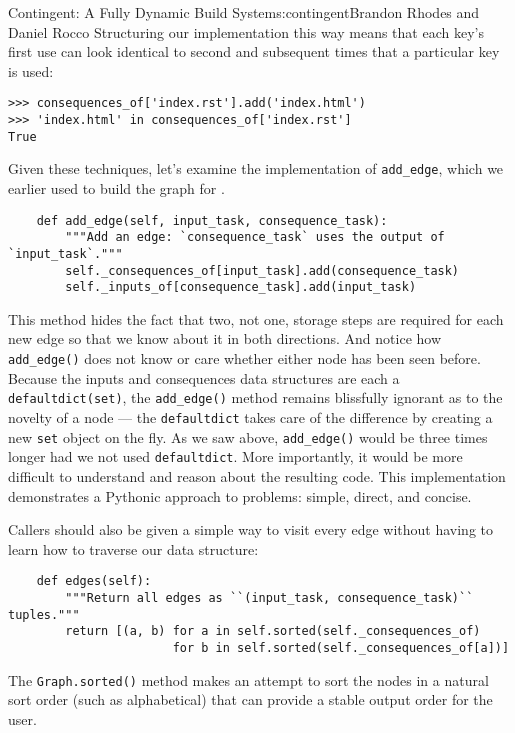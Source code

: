 \begin{aosachapter}{Contingent: A Fully Dynamic Build System}{s:contingent}{Brandon Rhodes and Daniel Rocco}
Structuring our implementation this way means that each key's first use
can look identical to second and subsequent times that a particular key
is used:

\begin{verbatim}
>>> consequences_of['index.rst'].add('index.html')
>>> 'index.html' in consequences_of['index.rst']
True
\end{verbatim}

Given these techniques, let's examine the implementation of
\texttt{add\_edge}, which we earlier used to build the graph for
.

\begin{verbatim}
    def add_edge(self, input_task, consequence_task):
        """Add an edge: `consequence_task` uses the output of `input_task`."""
        self._consequences_of[input_task].add(consequence_task)
        self._inputs_of[consequence_task].add(input_task)
\end{verbatim}

This method hides the fact that two, not one, storage steps are required
for each new edge so that we know about it in both directions. And
notice how \texttt{add\_edge()} does not know or care whether either
node has been seen before. Because the inputs and consequences data
structures are each a \texttt{defaultdict(set)}, the
\texttt{add\_edge()} method remains blissfully ignorant as to the
novelty of a node --- the \texttt{defaultdict} takes care of the
difference by creating a new \texttt{set} object on the fly. As we saw
above, \texttt{add\_edge()} would be three times longer had we not used
\texttt{defaultdict}. More importantly, it would be more difficult to
understand and reason about the resulting code. This implementation
demonstrates a Pythonic approach to problems: simple, direct, and
concise.

Callers should also be given a simple way to visit every edge without
having to learn how to traverse our data structure:

\begin{verbatim}
    def edges(self):
        """Return all edges as ``(input_task, consequence_task)`` tuples."""
        return [(a, b) for a in self.sorted(self._consequences_of)
                       for b in self.sorted(self._consequences_of[a])]
\end{verbatim}

The \texttt{Graph.sorted()} method makes an attempt to sort the nodes in
a natural sort order (such as alphabetical) that can provide a stable
output order for the user.


\end{aosachapter}
